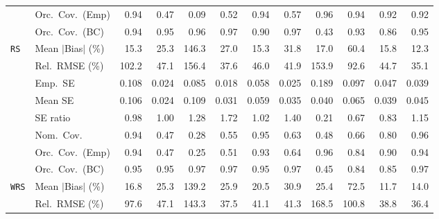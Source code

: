 \begin{landscape}
\begin{longtable}{llrrrrrrrrrr}
 & Orc.\ Cov.\ (Emp) & \cellcolor{rankone}0.94 & 0.47 & 0.09 & 0.52 & \cellcolor{rankone}0.94 & \cellcolor{rankthree}0.57 & \cellcolor{rankone}0.96 & \cellcolor{rankone}0.94 & \cellcolor{ranktwo}0.92 & \cellcolor{ranktwo}0.92 \\
 & Orc.\ Cov.\ (BC) & \cellcolor{ranktwo}0.94 & \cellcolor{rankone}0.95 & \cellcolor{ranktwo}0.96 & \cellcolor{rankthree}0.97 & 0.90 & \cellcolor{rankthree}0.97 & 0.43 & \cellcolor{rankthree}0.93 & 0.86 & \cellcolor{rankone}0.95 \\
\addlinespace[2pt]
\quad \texttt{RS} & Mean $|$Bias$|$ (\%) & \cellcolor{ranktwo}15.3 & 25.3 & 146.3 & 27.0 & \cellcolor{ranktwo}15.3 & 31.8 & 17.0 & 60.4 & \cellcolor{rankthree}15.8 & \cellcolor{rankone}12.3 \\
 & Rel.\ RMSE (\%) & 102.2 & 47.1 & 156.4 & \cellcolor{ranktwo}37.6 & 46.0 & \cellcolor{rankthree}41.9 & 153.9 & 92.6 & 44.7 & \cellcolor{rankone}35.1 \\
 & Emp.\ SE & 0.108 & 0.024 & 0.085 & 0.018 & 0.058 & 0.025 & 0.189 & 0.097 & 0.047 & 0.039 \\
 & Mean SE & 0.106 & 0.024 & 0.109 & 0.031 & 0.059 & 0.035 & 0.040 & 0.065 & 0.039 & 0.045 \\
 & SE ratio & \cellcolor{ranktwo}0.98 & \cellcolor{rankone}1.00 & 1.28 & 1.72 & \cellcolor{ranktwo}1.02 & 1.40 & 0.21 & 0.67 & 0.83 & \cellcolor{rankthree}1.15 \\
 & Nom.\ Cov. & \cellcolor{ranktwo}0.94 & 0.47 & 0.28 & 0.55 & \cellcolor{rankone}0.95 & 0.63 & 0.48 & 0.66 & \cellcolor{rankthree}0.80 & \cellcolor{ranktwo}0.96 \\
 & Orc.\ Cov.\ (Emp) & \cellcolor{rankone}0.94 & 0.47 & 0.25 & 0.51 & \cellcolor{ranktwo}0.93 & 0.64 & \cellcolor{rankone}0.96 & 0.84 & \cellcolor{rankthree}0.90 & \cellcolor{rankone}0.94 \\
 & Orc.\ Cov.\ (BC) & \cellcolor{rankone}0.95 & \cellcolor{rankone}0.95 & \cellcolor{ranktwo}0.97 & \cellcolor{ranktwo}0.97 & \cellcolor{rankone}0.95 & \cellcolor{ranktwo}0.97 & 0.45 & 0.84 & \cellcolor{rankthree}0.85 & \cellcolor{ranktwo}0.97 \\
\addlinespace[2pt]
\quad \texttt{WRS} & Mean $|$Bias$|$ (\%) & \cellcolor{rankthree}16.8 & 25.3 & 139.2 & 25.9 & 20.5 & 30.9 & 25.4 & 72.5 & \cellcolor{rankone}11.7 & \cellcolor{ranktwo}14.0 \\
 & Rel.\ RMSE (\%) & 97.6 & 47.1 & 143.3 & \cellcolor{ranktwo}37.5 & 41.1 & 41.3 & 168.5 & 100.8 & \cellcolor{rankthree}38.8 & \cellcolor{rankone}36.4 \\

\end{longtable}
\end{landscape}
